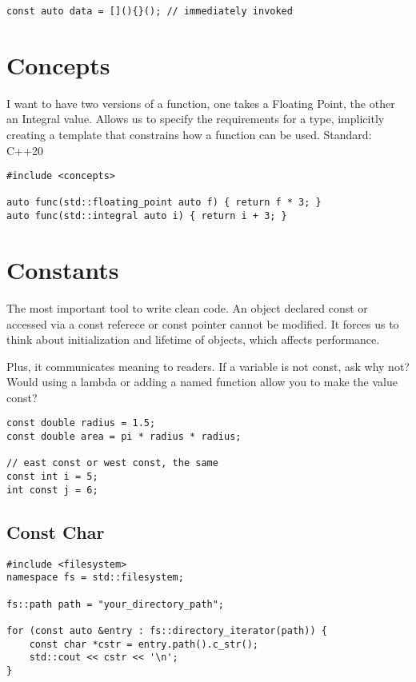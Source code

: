 \begin{verbatim}
const auto data = [](){}(); // immediately invoked
\end{verbatim}

\section{Concepts}

I want to have two versions of a function, one takes a Floating Point, the other an Integral value.
Allows us to specify the requirements for a type, implicitly creating a template
that constrains how a function can be used. Standard: C++20

\begin{verbatim}
#include <concepts>

auto func(std::floating_point auto f) { return f * 3; }
auto func(std::integral auto i) { return i + 3; }
\end{verbatim}

\section{Constants}

The most important tool to write clean code.
An object declared const or accessed via a const referece or const pointer cannot be modified.
It forces us to think about initialization and lifetime of objects, which affects performance. 

Plus, it communicates meaning to readers. 
If a variable is not const, ask why not?
Would using a lambda or adding a named function allow you to make the value const?

\begin{verbatim}
const double radius = 1.5;
const double area = pi * radius * radius;

// east const or west const, the same
const int i = 5;
int const j = 6;
\end{verbatim}

\subsection{Const Char}

\begin{verbatim}
#include <filesystem>
namespace fs = std::filesystem;

fs::path path = "your_directory_path";

for (const auto &entry : fs::directory_iterator(path)) {
    const char *cstr = entry.path().c_str();
    std::cout << cstr << '\n';
}
\end{verbatim}

